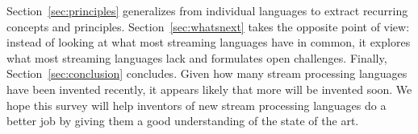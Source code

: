Section~\ref{sec:principles} generalizes from individual languages to
extract recurring concepts and principles. Section~\ref{sec:whatsnext}
takes the opposite point of view: instead of looking at what most
streaming languages have in common, it explores what most streaming
languages lack and formulates open challenges. Finally,
Section~\ref{sec:conclusion} concludes. Given how many stream
processing languages have been invented recently, it appears likely
that more will be invented soon. We hope this survey will help
inventors of new stream processing languages do a better job by giving
them a good understanding of the state of the art.
